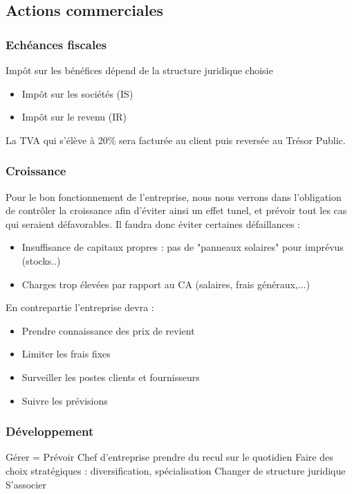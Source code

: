 \documentclass[11pt]{article}
\begin{document}
\subsection{Actions commerciales}
\label{sub:actions_commerciales}


\subsubsection{Echéances fiscales}
\label{ssub:echéance_fiscales}

Impôt sur les bénéfices dépend de la structure juridique choisie 
\begin{itemize}
	\item Impôt sur les sociétés (IS)
	\item Impôt sur le revenu (IR) \\
\end{itemize}


La TVA qui s'élève à 20\% sera facturée au client puis reversée au Trésor Public.

\subsubsection{Croissance}
\label{ssub:croissance}
Pour le bon fonctionnement de l'entreprise, nous nous verrons dans l'obligation de contrôler la croissance afin d'éviter ainsi un effet tunel, et prévoir tout les cas qui seraient défavorables.
Il faudra donc éviter certaines défaillances :
\begin{itemize}
	\item Insuffisance de capitaux propres : pas de "panneaux solaires" pour imprévus (stocks..)
	\item Charges trop élevées par rapport au CA (salaires, frais généraux,...)
\end{itemize}
En contrepartie l'entreprise devra :
\begin{itemize}
	\item Prendre connaissance des prix de revient
	\item Limiter les frais fixes
	\item Surveiller les postes clients et fournisseurs
	\item Suivre les prévisions
\end{itemize} 

\subsubsection{Développement}
\label{ssub:developpement}
Gérer = Prévoir
Chef d’entreprise 
prendre du recul sur le quotidien
Faire des choix stratégiques : diversification, spécialisation
Changer de structure juridique
S’associer

\end{document}
